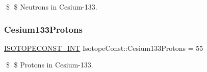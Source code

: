 \$ \$ Neutrons in Cesium-\/133. \mbox{\label{group___isotope_const-_cesium-_cs133_ga757c0f9e3615c840bc46a9fb5a60d92c}} 
\subsubsection{\texorpdfstring{Cesium133\+Protons}{Cesium133Protons}}
{\footnotesize\ttfamily \mbox{\hyperlink{group___isotope_const-_macros_ga5f18360b3e99483a35c32d789e62621c}{I\+S\+O\+T\+O\+P\+E\+C\+O\+N\+S\+T\+\_\+\+I\+NT}} Isotope\+Const\+::\+Cesium133\+Protons = 55}

\$ \$ Protons in Cesium-\/133. 